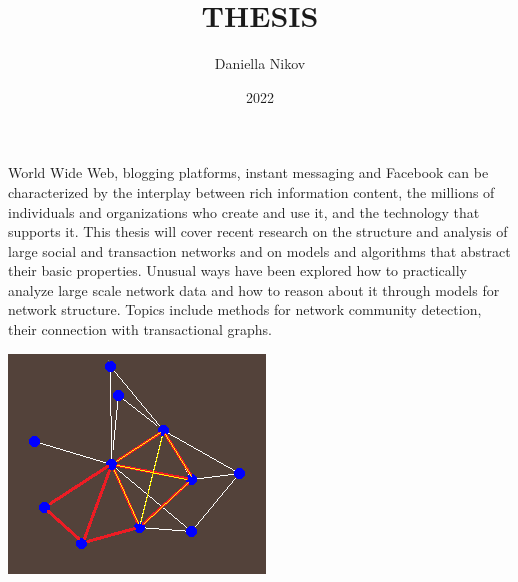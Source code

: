 \documentclass{article}
\title{THESIS}
\author{Daniella Nikov}
\date{2022}
\begin{document}
\maketitle

World Wide Web, blogging platforms, instant messaging and Facebook can be characterized by the interplay between rich information content, the millions of individuals and organizations who create and use it, and the technology that supports it. This thesis will cover recent research on the structure and analysis of large social and transaction networks and on models and algorithms that abstract their basic properties. Unusual ways have been explored how to practically analyze large scale network data and how to reason about it through models for network structure. Topics include methods for network community detection, their connection with transactional graphs.

\includegraphics{legyezo}
\end{document}

